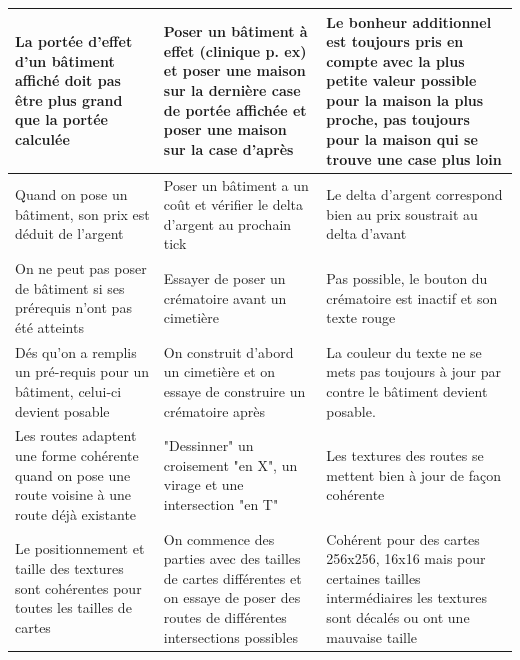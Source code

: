 \documentclass[a4paper,10pt,openany,oneside]{report}
\begin{document}
\begin{center}
\begin{longtable}{| p{} | p{} | p{} |}
		\\ \hline La portée d'effet d'un bâtiment affiché doit pas être plus grand que la portée calculée & Poser un bâtiment à effet (clinique p. ex) et poser une maison sur la dernière case de portée affichée et poser une maison sur la case d'après & Le bonheur additionnel est toujours pris en compte avec la plus petite valeur possible pour la maison la plus proche, pas toujours pour la maison qui se trouve une case plus loin
		\\ \hline Quand on pose un bâtiment, son prix est déduit de l'argent & Poser un bâtiment a un coût et vérifier le delta d'argent au prochain tick & Le delta d'argent correspond bien au prix soustrait au delta d'avant
		\\ \hline On ne peut pas poser de bâtiment si ses prérequis n'ont pas été atteints & Essayer de poser un crématoire avant un cimetière & Pas possible, le bouton du crématoire est inactif et son texte rouge
		\\ \hline Dés qu'on a remplis un pré-requis pour un bâtiment, celui-ci devient posable & On construit d'abord un cimetière et on essaye de construire un crématoire après & La couleur du texte ne se mets pas toujours à jour par contre le bâtiment devient posable.
		\\ \hline 
		Les routes adaptent une forme cohérente quand on pose une route voisine à une route déjà existante & "Dessinner" un croisement "en X", un virage et une intersection "en T" & Les textures des routes se mettent bien à jour de façon cohérente
		\\ \hline Le positionnement et taille des textures sont cohérentes pour toutes les tailles de cartes & On commence des parties avec des tailles de cartes différentes et on essaye de poser des routes de différentes intersections possibles & Cohérent pour des cartes 256x256, 16x16 mais pour certaines tailles intermédiaires les textures sont décalés ou ont une mauvaise taille
		\\ \hline
	\end{longtable}
\end{center}
\end{document}
